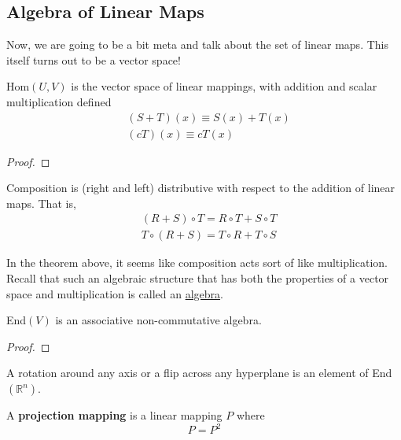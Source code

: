 \subsection{Algebra of Linear Maps}

  Now, we are going to be a bit meta and talk about the set of linear maps. This itself turns out to be a vector space! 

  \begin{definition}
    Hom$(U, V)$ is the vector space of linear mappings, with addition and scalar multiplication defined
    \begin{align*}
      & (S + T) (x) \equiv S(x) + T(x) \\
      & (c T) (x) \equiv c T(x)
    \end{align*}
  \end{definition}
  \begin{proof}
    
  \end{proof}

  \begin{theorem}
    Composition is (right and left) distributive with respect to the addition of linear maps. That is, 
    \begin{align}
      & (R + S) \circ T = R \circ T + S \circ T \\
      & T \circ (R + S) = T \circ R + T \circ S 
    \end{align}
  \end{theorem}

  In the theorem above, it seems like composition acts sort of like multiplication. Recall that such an algebraic structure that has both the properties of a vector space and multiplication is called an \hyperref[alg-def:algebra]{algebra}. 

  \begin{definition}
    End$(V)$ is an associative non-commutative algebra. 
  \end{definition}
  \begin{proof}
    
  \end{proof}

  \begin{example}
    A rotation around any axis or a flip across any hyperplane is an element of End$(\mathbb{R}^n)$. 
  \end{example}

  \begin{definition}[Projection]
    A \textbf{projection mapping} is a linear mapping $P$ where 
    \begin{equation}
      P = P^2
    \end{equation}
  \end{definition}

